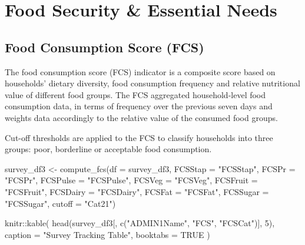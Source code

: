 \documentclass[
  letterpaper,
  DIV=11,
  numbers=noendperiod]{scrreprt}
\newenvironment{Shaded}{\begin{snugshade}}{\end{snugshade}}
\newcommand{\AttributeTok}[1]{\textcolor[rgb]{0.40,0.45,0.13}{#1}}
\newcommand{\ConstantTok}[1]{\textcolor[rgb]{0.56,0.35,0.01}{#1}}
\newcommand{\DecValTok}[1]{\textcolor[rgb]{0.68,0.00,0.00}{#1}}
\newcommand{\FunctionTok}[1]{\textcolor[rgb]{0.28,0.35,0.67}{#1}}
\newcommand{\NormalTok}[1]{\textcolor[rgb]{0.00,0.23,0.31}{#1}}
\newcommand{\OtherTok}[1]{\textcolor[rgb]{0.00,0.23,0.31}{#1}}
\newcommand{\SpecialCharTok}[1]{\textcolor[rgb]{0.37,0.37,0.37}{#1}}
\newcommand{\StringTok}[1]{\textcolor[rgb]{0.13,0.47,0.30}{#1}}
\begin{document}
\section{Food Security \& Essential
Needs}\label{food-security-essential-needs}

\subsection{Food Consumption Score
(FCS)}\label{food-consumption-score-fcs}

The food consumption score (FCS) indicator is a composite score based on
households' dietary diversity, food consumption frequency and relative
nutritional value of different food groups. The FCS aggregated
household-level food consumption data, in terms of frequency over the
previous seven days and weights data accordingly to the relative value
of the consumed food groups.

Cut-off thresholds are applied to the FCS to classify households into
three groups: poor, borderline or acceptable food consumption.

\begin{Shaded}
\begin{Highlighting}[]
\NormalTok{survey\_df3 }\OtherTok{\textless{}{-}} \FunctionTok{compute\_fcs}\NormalTok{(}\AttributeTok{df =}\NormalTok{ survey\_df3,}
                          \AttributeTok{FCSStap =} \StringTok{"FCSStap"}\NormalTok{,}
                          \AttributeTok{FCSPr =} \StringTok{"FCSPr"}\NormalTok{,}
                          \AttributeTok{FCSPulse =} \StringTok{"FCSPulse"}\NormalTok{,}
                          \AttributeTok{FCSVeg =} \StringTok{"FCSVeg"}\NormalTok{,}
                          \AttributeTok{FCSFruit =} \StringTok{"FCSFruit"}\NormalTok{,}
                          \AttributeTok{FCSDairy =} \StringTok{"FCSDairy"}\NormalTok{,}
                          \AttributeTok{FCSFat =} \StringTok{"FCSFat"}\NormalTok{,}
                          \AttributeTok{FCSSugar =} \StringTok{"FCSSugar"}\NormalTok{,}
                          \AttributeTok{cutoff =} \StringTok{"Cat21"}\NormalTok{)}
\end{Highlighting}
\end{Shaded}

\begin{Shaded}
\begin{Highlighting}[]
\NormalTok{knitr}\SpecialCharTok{::}\FunctionTok{kable}\NormalTok{(}
  \FunctionTok{head}\NormalTok{(survey\_df3[, }\FunctionTok{c}\NormalTok{(}\StringTok{"ADMIN1Name"}\NormalTok{, }\StringTok{"FCS"}\NormalTok{, }\StringTok{"FCSCat"}\NormalTok{)], }\DecValTok{5}\NormalTok{),}
  \AttributeTok{caption =} \StringTok{"Survey Tracking Table"}\NormalTok{,}
  \AttributeTok{booktabs =} \ConstantTok{TRUE}
\NormalTok{)}
\end{Highlighting}
\end{Shaded}
\end{document}
